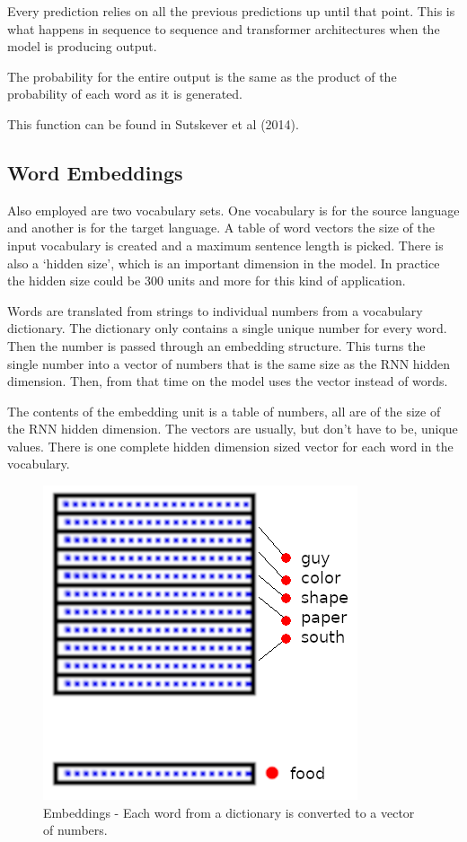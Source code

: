 Every prediction relies on all the previous predictions up until that point. This is what happens in sequence to sequence and transformer architectures when the model is producing output. 

The probability for the entire output is the same as the product of the probability of each word as it is generated.

This function can be found in Sutskever et al (2014)\cite{DBLP:journals/corr/SutskeverVL14}.


\subsection*{Word Embeddings}

Also employed are two vocabulary sets. One vocabulary is for the source language and another is for the target language. A table of word vectors the size of the input vocabulary is created and a maximum sentence length is picked. There is also a `hidden size', which is an important dimension in the model. In practice the hidden size could be 300 units and more for this kind of application.

Words are translated from strings to individual numbers from a vocabulary dictionary. The dictionary only contains a single unique number for every word. Then the number is passed through an embedding structure. This turns the single number into a vector of numbers that is the same size as the RNN hidden dimension. Then, from that time on the model uses the vector instead of words.

The contents of the embedding unit is a table of numbers, all are of the size of the RNN hidden dimension. The vectors are usually, but don\textquoteright t have to be, unique values. There is one complete hidden dimension sized vector for each word in the vocabulary. 

\begin{figure}[H]
	\begin{center}
		\includegraphics[scale=0.5]{diagram-embedding}
		
		
	\end{center}
	\caption[Word Embeddings]{Embeddings - Each word from a dictionary is converted to a vector of numbers.}
	
\end{figure}

